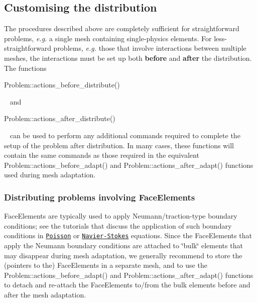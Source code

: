 \hypertarget{index_advanced}{}\subsection{Customising the distribution}\label{index_advanced}
The procedures described above are completely sufficient for straightforward problems, {\itshape  e.\+g. } a single mesh containing single-\/physics elements. For less-\/straightforward problems, {\itshape  e.\+g. } those that involve interactions between multiple meshes, the interactions must be set up both {\bfseries  before } and {\bfseries  after } the distribution. The functions ~\newline
~\newline

\begin{DoxyCode}
Problem::actions\_before\_distribute()
\end{DoxyCode}
 ~\newline
and ~\newline
~\newline

\begin{DoxyCode}
Problem::actions\_after\_distribute()
\end{DoxyCode}
 ~\newline
can be used to perform any additional commands required to complete the setup of the problem after distribution. In many cases, these functions will contain the same commands as those required in the equivalent {\ttfamily Problem\+::actions\+\_\+before\+\_\+adapt()} and {\ttfamily Problem\+::actions\+\_\+after\+\_\+adapt()} functions used during mesh adaptation.



\hypertarget{index_face_elements}{}\subsubsection{Distributing problems involving Face\+Elements}\label{index_face_elements}
{\ttfamily Face\+Elements} are typically used to apply Neumann/traction-\/type boundary conditions; see the tutorials that discuss the application of such boundary conditions in \href{../../../poisson/two_d_poisson_flux_bc/html/index.html}{\tt Poisson} or \href{../../../navier_stokes/rayleigh_traction_channel/html/index.html}{\tt Navier-\/\+Stokes} equations. Since the {\ttfamily Face\+Elements} that apply the Neumann boundary conditions are attached to \char`\"{}bulk\char`\"{} elements that may disappear during mesh adaptation, we generally recommend to store the (pointers to the) {\ttfamily Face\+Elements} in a separate mesh, and to use the {\ttfamily Problem\+::actions\+\_\+before\+\_\+adapt()} and {\ttfamily Problem\+::actions\+\_\+after\+\_\+adapt()} functions to detach and re-\/attach the {\ttfamily Face\+Elements} to/from the bulk elements before and after the mesh adaptation.

